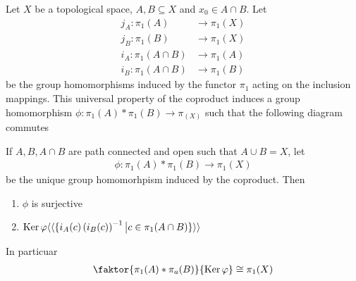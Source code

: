 Let $X$ be a topological space, $A,B \subseteq X$ and $x_0 \in A \cap B$.
Let
\begin{align*}
  j_A: \pi_1(A) &\to \pi_1(X)\\
  j_B: \pi_1(B) &\to \pi_1(X)\\
  i_A: \pi_1(A\cap B) &\to \pi_1(A)\\
  i_B: \pi_1(A\cap B) &\to \pi_1(B)
\end{align*}
be the group homomorphisms induced by the functor $\pi_1$ acting on the inclusion mappings.
This universal property of the coproduct induces a group homomorphism
$\phi: \pi_1(A) \ast \pi_1(B) \to \pi_(X)$ such that the following diagram commutes
\begin{center}
\end{center}
\begin{thm}

If $A,B,A \cap B$ are path connected and open such that $A \cup B = X$, let
\begin{align*}
  \phi: \pi_1(A) \ast \pi_1(B) \to \pi_1(X)
\end{align*}
be the unique group homomorhpism induced by the coproduct. Then
\begin{enumerate}
  \item $\phi$ is surjective
  \item $\operatorname{Ker} \varphi \langle\langle\{i_A(c)\left(
            i_B(c)
    \right)^{-1} \big\vert
    c \in \pi_1(A \cap B) 
    \}\rangle\rangle$
\end{enumerate}
In particuar
\begin{align*}
  \faktor{\pi_1(A) \ast \pi_a(B)}{\Ker \phi} \iso \pi_1(X)
\end{align*}
\end{thm}
